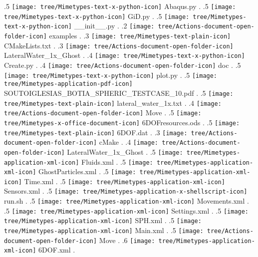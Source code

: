 {.5 { \texttt{[image: tree/Mimetypes-text-x-python-icon]} Abaqus.py }.
.5 { \texttt{[image: tree/Mimetypes-text-x-python-icon]} GiD.py }.
.5 { \texttt{[image: tree/Mimetypes-text-x-python-icon]} \_\_init\_\_.py }.
.2 { \texttt{[image: tree/Actions-document-open-folder-icon]} examples }.
.3 { \texttt{[image: tree/Mimetypes-text-plain-icon]} CMakeLists.txt }.
.3 { \texttt{[image: tree/Actions-document-open-folder-icon]} LateralWater\_1x\_Ghost }.
.4 { \texttt{[image: tree/Mimetypes-text-x-python-icon]} Create.py }.
.4 { \texttt{[image: tree/Actions-document-open-folder-icon]} doc }.
.5 { \texttt{[image: tree/Mimetypes-text-x-python-icon]} plot.py }.
.5 { \texttt{[image: tree/Mimetypes-application-pdf-icon]} SOUTOIGLESIAS\_BOTIA\_SPHERIC\_TESTCASE\_10.pdf }.
.5 { \texttt{[image: tree/Mimetypes-text-plain-icon]} lateral\_water\_1x.txt }.
.4 { \texttt{[image: tree/Actions-document-open-folder-icon]} Move }.
.5 { \texttt{[image: tree/Mimetypes-x-office-document-icon]} 6DOFresources.ods }.
.5 { \texttt{[image: tree/Mimetypes-text-plain-icon]} 6DOF.dat }.
.3 { \texttt{[image: tree/Actions-document-open-folder-icon]} cMake }.
.4 { \texttt{[image: tree/Actions-document-open-folder-icon]} LateralWater\_1x\_Ghost }.
.5 { \texttt{[image: tree/Mimetypes-application-xml-icon]} Fluids.xml }.
.5 { \texttt{[image: tree/Mimetypes-application-xml-icon]} GhostParticles.xml }.
.5 { \texttt{[image: tree/Mimetypes-application-xml-icon]} Time.xml }.
.5 { \texttt{[image: tree/Mimetypes-application-xml-icon]} Sensors.xml }.
.5 { \texttt{[image: tree/Mimetypes-application-x-shellscript-icon]} run.sh }.
.5 { \texttt{[image: tree/Mimetypes-application-xml-icon]} Movements.xml }.
.5 { \texttt{[image: tree/Mimetypes-application-xml-icon]} Settings.xml }.
.5 { \texttt{[image: tree/Mimetypes-application-xml-icon]} SPH.xml }.
.5 { \texttt{[image: tree/Mimetypes-application-xml-icon]} Main.xml }.
.5 { \texttt{[image: tree/Actions-document-open-folder-icon]} Move }.
.6 { \texttt{[image: tree/Mimetypes-application-xml-icon]} 6DOF.xml }.
}
